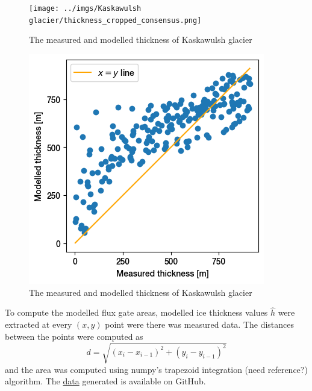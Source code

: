 \documentclass[a4, 12pt]{article}
\begin{document}
\begin{figure}[h!]
\centering
\texttt{[image: ../imgs/Kaskawulsh glacier/thickness\_cropped\_consensus.png]}
\caption{The measured and modelled thickness of Kaskawulsh glacier}
\label{fig:kaska_thickness}
\end{figure}
\begin{figure}[h!]
\centering
\includegraphics[scale=0.5]{../imgs/Kaskawulsh glacier/xy_scatter_consensus.png}
\caption{The measured and modelled thickness of Kaskawulsh glacier}
\label{fig:kaska_xy}
\end{figure}
To compute the modelled flux gate areas, modelled ice thickness values $\hat{h}$ were extracted at every $(x, y)$ point were there was measured data. The distances between the points were computed as
\[ d=\sqrt{(x_i - x_{i-1})^2 + (y_i - y_{i-1})^2}\] and the area was computed using numpy's trapezoid integration (need reference?) algorithm. The \href{https://github.com/aleximorin/USRA-2020-AlexiMorin/blob/master/transects_area_GATE_v2.csv}{data} generated is available on GitHub.






\end{document}
